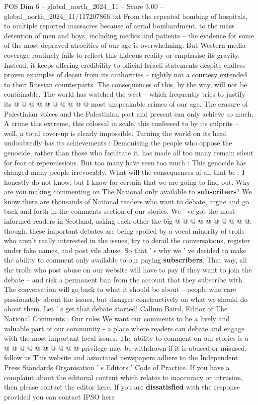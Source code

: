 \begin{textsample}{POS Dim 6 – global\_north\_2024\_11 – Score 3.00 – global\_north\_2024\_11/117207866.txt}
From the repeated bombing of hospitals, to multiple reported massacres because of aerial bombardment, to the mass detention of men and boys, including medics and patients -- the evidence for some of the most depraved atrocities of our age is overwhelming.
But Western media coverage routinely fails to reflect this hideous reality or emphasise its gravity.
Instead, it keeps offering credibility to official Israeli statements despite endless proven examples of deceit from its authorities -- rightly not a courtesy extended to their Russian counterparts.
The consequences of this, by the way, will not be containable.
The world has watched the west -- which frequently tries to justify its @ @ @ @ @ @ @ @ @ @ most unspeakable crimes of our age.
The erasure of Palestinian voices and the Palestinian past and present can only achieve so much.
A crime this extreme, this colossal in scale, this confessed to by its culprits -- well, a total cover-up is clearly impossible.
Turning the world on its head undoubtedly has its achievements : Demonising the people who oppose the genocide, rather than those who facilitate it, has made all too many remain silent for fear of repercussions.
But too many have seen too much : This genocide has changed many people irrevocably.
What will the consequences of all that be : I honestly do not know, but I know for certain that we are going to find out.
Why are you making commenting on The National only available to \textbf{subscribers}?
We know there are thousands of National readers who want to debate, argue and go back and forth in the comments section of our stories.
We ' ve got the most informed readers in Scotland, asking each other the big @ @ @ @ @ @ @ @ @ @, though, these important debates are being spoiled by a vocal minority of trolls who aren't really interested in the issues, try to derail the conversations, register under fake names, and post vile abuse.
So that ' s why we ' ve decided to make the ability to comment only available to our paying \textbf{subscribers}.
That way, all the trolls who post abuse on our website will have to pay if they want to join the debate -- and risk a permanent ban from the account that they subscribe with.
The conversation will go back to what it should be about -- people who care passionately about the issues, but disagree constructively on what we should do about them.
Let ' s get that debate started!
Callum Baird, Editor of The National Comments : Our rules We want our comments to be a lively and valuable part of our community - a place where readers can debate and engage with the most important local issues.
The ability to comment on our stories is a @ @ @ @ @ @ @ @ @ @ privilege may be withdrawn if it is abused or misused. follow us This website and associated newspapers adhere to the Independent Press Standards Organisation ' s Editors ' Code of Practice.
If you have a complaint about the editorial content which relates to inaccuracy or intrusion, then please contact the editor here.
If you are \textbf{dissatisfied} with the response provided you can contact IPSO here

\end{textsample}
